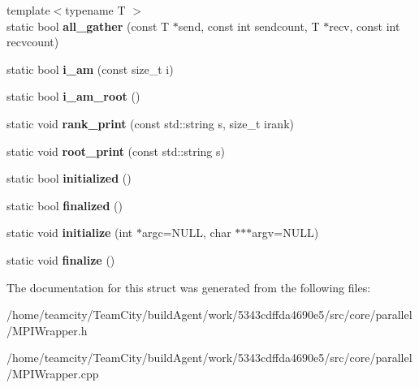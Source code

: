\begin{DoxyCompactItemize}
\item 
{\footnotesize template$<$typename T $>$ }\\static bool {\bfseries all\+\_\+gather} (const T $\ast$send, const int sendcount, T $\ast$recv, const int recvcount)\hypertarget{structmpi_a0acbc0ae6ec9f799fac752e65c45becd}{}\label{structmpi_a0acbc0ae6ec9f799fac752e65c45becd}

\item 
static bool {\bfseries i\+\_\+am} (const size\+\_\+t i)\hypertarget{structmpi_a42d19f01adb7413eaff8ffb1cda49a82}{}\label{structmpi_a42d19f01adb7413eaff8ffb1cda49a82}

\item 
static bool {\bfseries i\+\_\+am\+\_\+root} ()\hypertarget{structmpi_aa2c18e275823d9c53b1ef6d3f48088c8}{}\label{structmpi_aa2c18e275823d9c53b1ef6d3f48088c8}

\item 
static void {\bfseries rank\+\_\+print} (const std\+::string s, size\+\_\+t irank)\hypertarget{structmpi_a71e1846db31ce24abdf642573fa8ea55}{}\label{structmpi_a71e1846db31ce24abdf642573fa8ea55}

\item 
static void {\bfseries root\+\_\+print} (const std\+::string s)\hypertarget{structmpi_a7ceee095050664f6a6e733232644397d}{}\label{structmpi_a7ceee095050664f6a6e733232644397d}

\item 
static bool {\bfseries initialized} ()\hypertarget{structmpi_a3ba08520b44299d40f8aa067c9992e15}{}\label{structmpi_a3ba08520b44299d40f8aa067c9992e15}

\item 
static bool {\bfseries finalized} ()\hypertarget{structmpi_ae6e9e1345ba38aa99f6b3142d2afb764}{}\label{structmpi_ae6e9e1345ba38aa99f6b3142d2afb764}

\item 
static void {\bfseries initialize} (int $\ast$argc=N\+U\+LL, char $\ast$$\ast$$\ast$argv=N\+U\+LL)\hypertarget{structmpi_a43daaa66078a63ada3199185ed813af6}{}\label{structmpi_a43daaa66078a63ada3199185ed813af6}

\item 
static void {\bfseries finalize} ()\hypertarget{structmpi_ad33c704bbe732fa1ae5cb73bc16d26dc}{}\label{structmpi_ad33c704bbe732fa1ae5cb73bc16d26dc}

\end{DoxyCompactItemize}


The documentation for this struct was generated from the following files\+:\begin{DoxyCompactItemize}
\item 
/home/teamcity/\+Team\+City/build\+Agent/work/5343cdffda4690e5/src/core/parallel/M\+P\+I\+Wrapper.\+h\item 
/home/teamcity/\+Team\+City/build\+Agent/work/5343cdffda4690e5/src/core/parallel/M\+P\+I\+Wrapper.\+cpp\end{DoxyCompactItemize}
